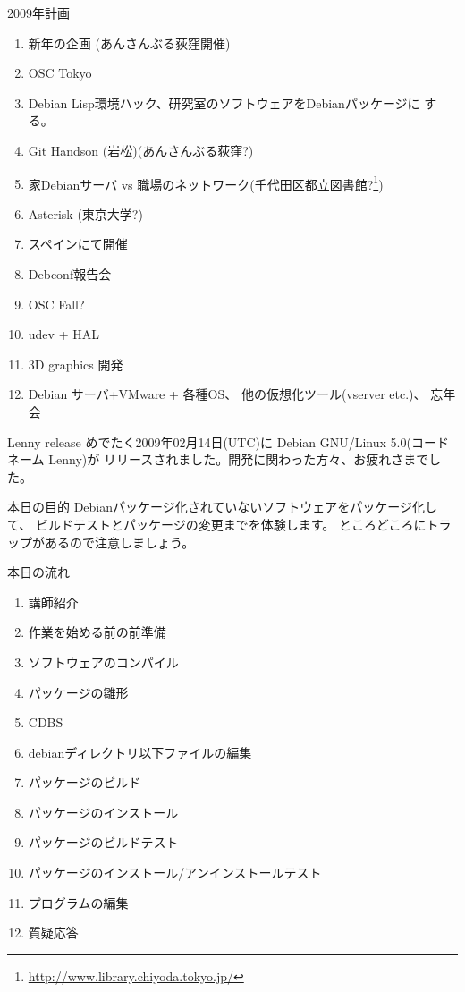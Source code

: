 \begin{frame}{2009年計画}

{\scriptsize
 \begin{enumerate}
  \item 新年の企画 (あんさんぶる荻窪開催)
  \item OSC Tokyo
  \item Debian Lisp環境ハック、研究室のソフトウェアをDebianパッケージに
	する。
  \item Git Handson (岩松)(あんさんぶる荻窪?)
  \item 家Debianサーバ vs 職場のネットワーク(千代田区都立図書館?\footnote{\url{http://www.library.chiyoda.tokyo.jp/}})
  \item Asterisk (東京大学?)
  \item スペインにて開催
  \item Debconf報告会
  \item OSC Fall?
  \item udev + HAL
  \item 3D graphics 開発 
  \item Debian サーバ+VMware + 各種OS、
	他の仮想化ツール(vserver etc.)、
	忘年会
 \end{enumerate}
}
\end{frame}


\begin{frame}{Lenny release}
めでたく2009年02月14日(UTC)に Debian GNU/Linux 5.0(コードネーム Lenny)が
 リリースされました。開発に関わった方々、お疲れさまでした。
\end{frame}

\begin{frame}{本日の目的}
Debianパッケージ化されていないソフトウェアをパッケージ化して、
ビルドテストとパッケージの変更までを体験します。
ところどころにトラップがあるので注意しましょう。
\end{frame}

\begin{frame}{本日の流れ}
\begin{enumerate}
\item 講師紹介
\item 作業を始める前の前準備
\item ソフトウェアのコンパイル
\item パッケージの雛形
\item CDBS
\item debianディレクトリ以下ファイルの編集
\item パッケージのビルド
\item パッケージのインストール
\item パッケージのビルドテスト
\item パッケージのインストール/アンインストールテスト
\item プログラムの編集
\item 質疑応答
\end{enumerate}
\end{frame}

